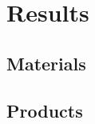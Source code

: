 \chapter{Results}
\label{chap:results}

\lipsum[1]

\section{Materials}

\lipsum[1]

\section{Products}

\lipsum[1]